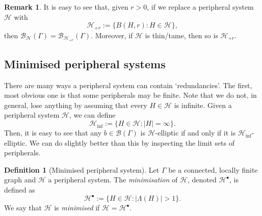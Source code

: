 \documentclass[11pt,a4paper]{amsart}
\theoremstyle{definition}
\newtheorem{definition}[theorem]{Definition}
\newtheorem{remark}[theorem]{Remark}
\newcommand{\per}{\mathcal{H}}
\newcommand{\br}{{\mathscr{B}}}
\begin{document}


\begin{remark}\label{rem:replace-with-neighbourhoods}
    It is easy to see that, given $r > 0$, if we replace a peripheral system $\per$ with
    $$
    \per_{+r} := \{B(H,r) : H \in \per\}, 
    $$
    then $\br_\per(\Gamma) = \br_{\per_{+r}}(\Gamma)$. Moreover, if $\per$ is thin/tame, then so is $\per_{+r}$. 
\end{remark}


\subsection{Minimised peripheral systems}

There are many ways a peripheral system can contain `redundancies'. The first, most obvious one is that some peripherals may be finite. 
Note that we do not, in general, lose anything by assuming that every $H \in \per$ is infinite. Given a peripheral system $\per$, we can define
$$
\per_{\inf} := \{H \in \per : |H| = \infty\}.
$$
Then, it is easy to see that any $b \in \br (\Gamma)$ is $\per$-elliptic if and only if it is $\per_{\inf}$-elliptic.
We can do slightly better than this by inspecting the limit sets of peripherals.


\begin{definition}[Minimised peripheral system]
    Let $\Gamma$ be a connected, locally finite graph and $\per$ a peripheral system. The \emph{minimisation} of $\per$, denoted $\per^\bullet$, is defined as
    $$
    \per^\bullet  := \Big\{ H \in \per: |\Lambda(H)| > 1\Big\}.
    $$
    We say that $\per$ is \emph{minimised} if $\per = \per^\bullet$. 
\end{definition}
\end{document}

